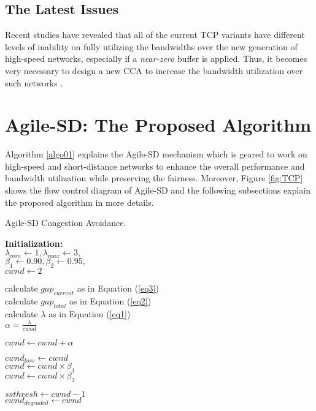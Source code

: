 \documentclass[preprint,3p,times,twocolumn,authoryear]{elsarticle}
\begin{document}
\subsection{The Latest Issues}
Recent studies have revealed that all of the current TCP variants have different levels of inability on fully utilizing the bandwidths over the new generation of high-speed networks, especially if a \emph{near-zero} buffer is applied. Thus, it becomes very necessary to design a new CCA to increase the bandwidth utilization over such networks \citep{Afanasyev2010, alrshah2014}.




\section{Agile-SD: The Proposed Algorithm}
\label{Agile-SD}

Algorithm \ref{algo01} explains the Agile-SD mechanism which is geared to work on high-speed and short-distance networks to enhance the overall performance and bandwidth utilization while preserving the fairness. Moreover, Figure \ref{fig:TCP} shows the flow control diagram of Agile-SD and the following subsections explain the proposed algorithm in more details.

\begin{algorithm}[t!]
\caption{Agile-SD Congestion Avoidance.}\label{algo01}

\textbf{Initialization:}\\
\hspace{0.5cm}$\lambda_{min} \leftarrow 1, \lambda_{max} \leftarrow 3,$\\
	\hspace{0.5cm}$\beta_1 \leftarrow 0.90, \beta_2 \leftarrow 0.95,$\\
	\hspace{0.5cm}$cwnd \leftarrow 2$

{
	calculate $gap_{current}$ as in Equation (\ref{eq3})\\
	
	calculate $gap_{total}$ as in Equation (\ref{eq2})\\

	calculate $\lambda$ as in Equation (\ref{eq1})\\

	$\alpha = \frac{\lambda}{cwnd}$


	$cwnd \leftarrow cwnd + \alpha$\\
}

{
	$cwnd_{loss} 	\leftarrow cwnd$\\
	
	{	
		$cwnd \leftarrow cwnd \times \beta_1$ \label{L13}\\
	}
	\Else
	{
		$cwnd \leftarrow cwnd \times \beta_2$ \label{L17}\\
	}
	
	$ssthresh 	\leftarrow cwnd - 1$\\
	$cwnd_{degraded} \leftarrow cwnd$\\
}
\end{algorithm} \DecMargin{1em}
\end{document}
